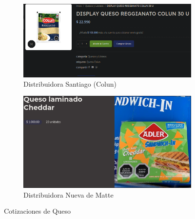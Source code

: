 \documentclass[12pt]{article}
\begin{document}
    \begin{figure}[H]
        \centering
        \begin{subfigure}{0.48\textwidth}
            \centering
            \includegraphics[width=\linewidth]{santiago} %
            \caption{Distribuidora Santiago (Colun)}
            \label{fig:distribuidora_santiago}
        \end{subfigure}
        \hfill
        \begin{subfigure}{0.48\textwidth}
            \centering
            \includegraphics[width=\linewidth]{nueva} %
            \caption{Distribuidora Nueva de Matte}
            \label{fig:distribuidora_nueva_de_matte}
        \end{subfigure}
        \caption{Cotizaciones de Queso}
        \label{fig:cotizaciones_queso}
    \end{figure}
    
\end{document}
